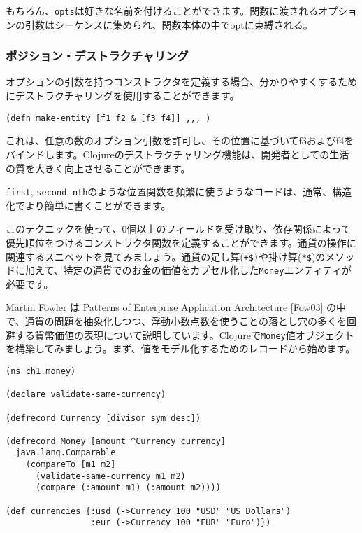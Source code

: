 もちろん、\texttt{opts}は好きな名前を付けることができます。関数に渡されるオプションの引数はシーケンスに集められ、関数本体の中でoptに束縛される。


\subsubsection{ポジション・デストラクチャリング}

オプションの引数を持つコンストラクタを定義する場合、分かりやすくするためにデストラクチャリングを使用することができます。

\begin{lstlisting}[numbers=none]
(defn make-entity [f1 f2 & [f3 f4]] ,,, )
\end{lstlisting}

これは、任意の数のオプション引数を許可し、その位置に基づいてf3およびf4をバインドします。Clojureのデストラクチャリング機能は、開発者としての生活の質を大きく向上させることができます。
      
\texttt{first}, \texttt{second}, \texttt{nth}のような位置関数を頻繁に使うようなコードは、通常、構造化でより簡単に書くことができます。

このテクニックを使って、0個以上のフィールドを受け取り、依存関係によって優先順位をつけるコンストラクタ関数を定義することができます。通貨の操作に関連するスニペットを見てみましょう。通貨の足し算(\texttt{+\$)}や掛け算(\texttt{*\$})のメソッドに加えて、特定の通貨でのお金の価値をカプセル化した\texttt{Money}エンティティが必要です。

Martin Fowler は Patterns of Enterprise Application Architecture [Fow03] の中で、通貨の問題を抽象化しつつ、浮動小数点数を使うことの落とし穴の多くを回避する貨幣価値の表現について説明しています。Clojureで\texttt{Money}値オブジェクトを構築してみましょう。まず、値をモデル化するためのレコードから始めます。

\begin{lstlisting}[numbers=none]
(ns ch1.money)

(declare validate-same-currency)

(defrecord Currency [divisor sym desc])

(defrecord Money [amount ^Currency currency]
  java.lang.Comparable
    (compareTo [m1 m2]
      (validate-same-currency m1 m2)
      (compare (:amount m1) (:amount m2))))

(def currencies {:usd (->Currency 100 "USD" "US Dollars")
                 :eur (->Currency 100 "EUR" "Euro")})
\end{lstlisting}

